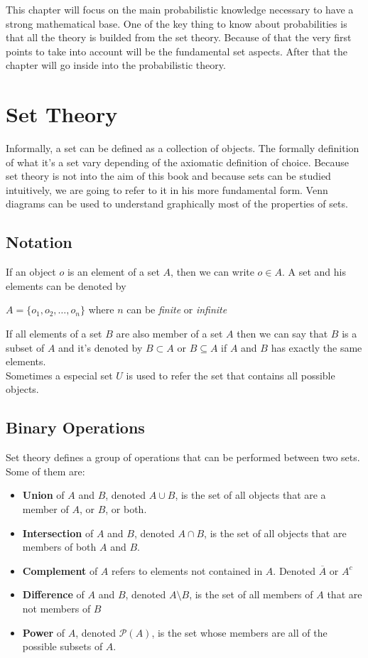 This chapter will focus on the main probabilistic knowledge necessary to have a
strong mathematical base. One of the key thing to know about probabilities is
that all the theory is builded from the set theory. Because of that the very
first points to take into account will be the fundamental set aspects. After
that the chapter will go inside into the probabilistic theory.

\section{Set Theory}
Informally, a set can be defined as a collection of objects. The formally
definition of what it's a set vary depending of the axiomatic definition of
choice. Because set theory is not into the aim of this book and because sets can
be studied intuitively, we are going to refer to it in his more fundamental
form. Venn diagrams can be used to understand graphically most of the properties
of sets.

\subsection{Notation}
If an object $o$ is an element of a set $A$, then we can write $o \in A$. A set
and his elements can be denoted by
\begin{center}
    $A = \{o_1, o_2, \dots , o_n\}$ where $n$ can be \textit{finite} or
    \textit{infinite}
\end{center}
If all elements of a set $B$ are also member of a set $A$ then we can say that
$B$ is a subset of $A$ and it's denoted by $B \subset A$ or $B \subseteq A$ if
$A$ and $B$ has exactly the same elements.\\
Sometimes a especial set $U$ is used to refer the set that contains all possible
objects.

\subsection{Binary Operations}
Set theory defines a group of operations that can be performed between two sets.
Some of them are:
\begin{itemize}
    \item \textbf{Union} of $A$ and $B$, denoted $A \cup B$, is the set of all
    objects that are a member of $A$, or $B$, or both.
    \item \textbf{Intersection} of $A$ and $B$, denoted $A \cap B$, is the set
    of all objects that are members of both $A$ and $B$.
    \item \textbf{Complement} of $A$ refers to elements not contained in $A$.
    Denoted $\overline{A}$ or $A^c$
    \item \textbf{Difference} of $A$ and $B$, denoted $A \setminus B$, is the
    set of all members of $A$ that are not members of $B$
    \item \textbf{Power} of $A$, denoted $\mathcal{P}(A)$, is the set whose
    members are all of the possible subsets of $A$. 
\end{itemize}

